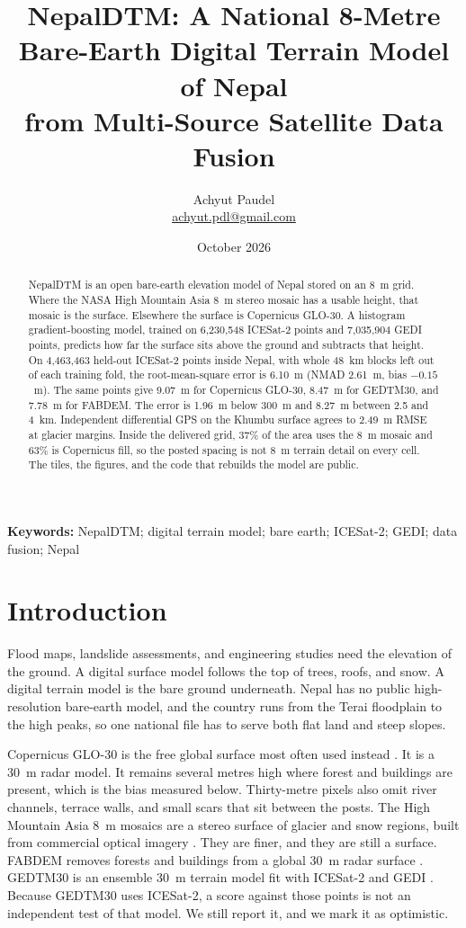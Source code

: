 \documentclass[11pt]{article}
\title{NepalDTM: A National 8-Metre Bare-Earth Digital Terrain Model of Nepal\\
from Multi-Source Satellite Data Fusion}
\author{Achyut Paudel\\
\small \href{mailto:achyut.pdl@gmail.com}{achyut.pdl@gmail.com}}
\date{October 2026}
\begin{document}
\maketitle

\begin{abstract}
NepalDTM is an open bare-earth elevation model of Nepal stored on an 8~m grid.
Where the NASA High Mountain Asia 8~m stereo mosaic has a usable height, that mosaic is the surface.
Elsewhere the surface is Copernicus GLO-30.
A histogram gradient-boosting model, trained on 6,230,548 ICESat-2 points and 7,035,904 GEDI points, predicts how far the surface sits above the ground and subtracts that height.
On 4,463,463 held-out ICESat-2 points inside Nepal, with whole 48~km blocks left out of each training fold, the root-mean-square error is 6.10~m (NMAD 2.61~m, bias $-0.15$~m).
The same points give 9.07~m for Copernicus GLO-30, 8.47~m for GEDTM30, and 7.78~m for FABDEM.
The error is 1.96~m below 300~m and 8.27~m between 2.5 and 4~km.
Independent differential GPS on the Khumbu surface agrees to 2.49~m RMSE at glacier margins.
Inside the delivered grid, 37\% of the area uses the 8~m mosaic and 63\% is Copernicus fill, so the posted spacing is not 8~m terrain detail on every cell.
The tiles, the figures, and the code that rebuilds the model are public.
\end{abstract}

\noindent\textbf{Keywords:} NepalDTM; digital terrain model; bare earth; ICESat-2; GEDI; data fusion; Nepal

\section{Introduction}

Flood maps, landslide assessments, and engineering studies need the elevation of the ground.
A digital surface model follows the top of trees, roofs, and snow.
A digital terrain model is the bare ground underneath.
Nepal has no public high-resolution bare-earth model, and the country runs from the Terai floodplain to the high peaks, so one national file has to serve both flat land and steep slopes.

Copernicus GLO-30 is the free global surface most often used instead \citep{esa2021copernicus}.
It is a 30~m radar model.
It remains several metres high where forest and buildings are present, which is the bias measured below.
Thirty-metre pixels also omit river channels, terrace walls, and small scars that sit between the posts.
The High Mountain Asia 8~m mosaics are a stereo surface of glacier and snow regions, built from commercial optical imagery \citep{shean2017hma}.
They are finer, and they are still a surface.
FABDEM removes forests and buildings from a global 30~m radar surface \citep{hawker2022fabdem}.
GEDTM30 is an ensemble 30~m terrain model fit with ICESat-2 and GEDI \citep{ho2025gedtm30}.
Because GEDTM30 uses ICESat-2, a score against those points is not an independent test of that model.
We still report it, and we mark it as optimistic.
\end{document}
